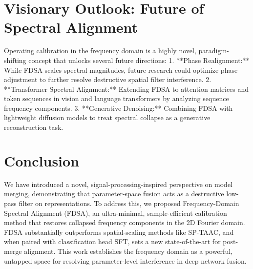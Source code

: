 \documentclass{article}
\begin{document}
\section{Visionary Outlook: Future of Spectral Alignment}
Operating calibration in the frequency domain is a highly novel, paradigm-shifting concept that unlocks several future directions:
1.  **Phase Realignment:** While FDSA scales spectral magnitudes, future research could optimize phase adjustment to further resolve destructive spatial filter interference.
2.  **Transformer Spectral Alignment:** Extending FDSA to attention matrices and token sequences in vision and language transformers by analyzing sequence frequency components.
3.  **Generative Denoising:** Combining FDSA with lightweight diffusion models to treat spectral collapse as a generative reconstruction task.

\section{Conclusion}
We have introduced a novel, signal-processing-inspired perspective on model merging, demonstrating that parameter-space fusion acts as a destructive low-pass filter on representations. To address this, we proposed Frequency-Domain Spectral Alignment (FDSA), an ultra-minimal, sample-efficient calibration method that restores collapsed frequency components in the 2D Fourier domain. FDSA substantially outperforms spatial-scaling methods like SP-TAAC, and when paired with classification head SFT, sets a new state-of-the-art for post-merge alignment. This work establishes the frequency domain as a powerful, untapped space for resolving parameter-level interference in deep network fusion.

\clearpage


\end{document}
